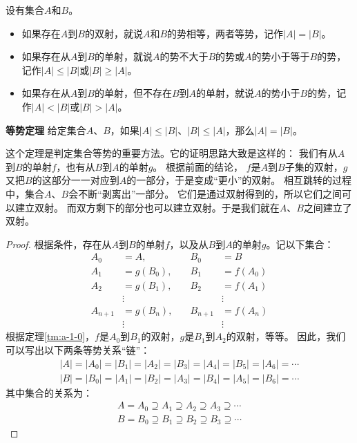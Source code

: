 \documentclass[12pt,UTF8,fontset=none]{ctexbook}
\begin{document}
\begin{appendix}
\begin{df}\label{df:a-1-10}
    设有集合$A$和$B$。
    \begin{itemize}
        \item 如果存在$A$到$B$的双射，就说$A$和$B$的势相等，两者等势，记作$|A| = |B|$。
        \item 如果存在从$A$到$B$的单射，就说$A$的势不大于$B$的势或$A$的势小于等于$B$的势，记作$|A| \leqslant |B|$或$|B| \geqslant |A|$。
        \item 如果存在从$A$到$B$的单射，但不存在$B$到$A$的单射，就说$A$的势小于$B$的势，记作$|A| < |B|$或$|B| > |A|$。
    \end{itemize}
\end{df}

\begin{tm}{\textbf{等势定理}}\label{tm:a-1-10}
    给定集合$A$、$B$，如果$|A| \leqslant |B|$、$|B| \leqslant |A|$，那么$|A| = |B|$。
\end{tm}

这个定理是判定集合等势的重要方法。它的证明思路大致是这样的：
我们有从$A$到$B$的单射$f$，也有从$B$到$A$的单射$g$。
根据前面的结论，
$f$是$A$到$B$子集的双射，$g$又把$B$的这部分一一对应到$A$的一部分，于是变成“更小”的双射。
相互跳转的过程中，集合$A$、$B$会不断“剥离出”一部分。
它们是通过双射得到的，所以它们之间可以建立双射。
而双方剩下的部分也可以建立双射。于是我们就在$A$、$B$之间建立了双射。

\begin{proof}
    根据条件，存在从$A$到$B$的单射$f$，以及从$B$到$A$的单射$g$。记以下集合：
    $$
    \begin{array}{rlrl}
        A_0&= A, \quad & B_0 &= B \\
        A_1&= g(B_0), \quad & B_1 &= f(A_0) \\
        A_2&= g(B_1), \quad & B_2 &= f(A_1) \\
        &\vdots & &\vdots \\
        A_{n+1}&= g(B_n), \quad & B_{n+1} &= f(A_n) \\
        &\vdots & &\vdots
    \end{array}
    $$
    根据定理\ref{tm:a-1-0}，$f$是$A_0$到$B_1$的双射，$g$是$B_1$到$A_2$的双射，等等。
    因此，我们可以写出以下两条等势关系“链”：
    \begin{align*}
        |A| = |A_0| = |B_1| = |A_2| = |B_3| = |A_4| = |B_5| = |A_6| = \cdots  \\
        |B| = |B_0| = |A_1| = |B_2| = |A_3| = |B_4| = |A_5| = |B_6| = \cdots   
    \end{align*}
    其中集合的关系为：
    \begin{align*}
        A = A_0 \supseteq A_1 \supseteq A_2 \supseteq A_3  \supseteq \cdots  \\
        B = B_0 \supseteq B_1 \supseteq B_2 \supseteq B_3  \supseteq \cdots   
    \end{align*}
    

\end{proof}
\end{appendix}
\end{document}

